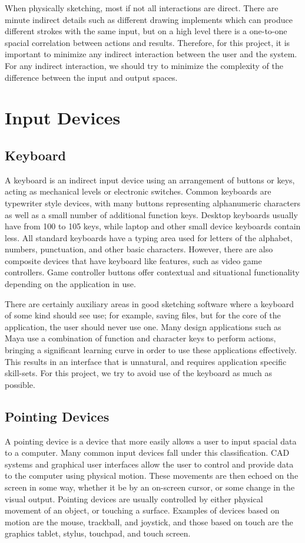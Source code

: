 When physically sketching, most if not all interactions are direct. 
There are minute indirect details such as different drawing implements which can produce different strokes with the same input, but on a high level there is a one-to-one spacial correlation between actions and results.
Therefore, for this project, it is important to minimize any indirect interaction between the user and the system.
For any indirect interaction, we should try to minimize the complexity of the difference between the input and output spaces.

\section{Input Devices}
\subsection{Keyboard}

A keyboard is an indirect input device using an arrangement of buttons or keys, acting as mechanical levels or electronic switches. 
Common keyboards are typewriter style devices, with many buttons representing alphanumeric characters as well as a small number of additional function keys.
Desktop keyboards usually have from 100 to 105 keys, while laptop and other small device keyboards contain less.
All standard keyboards have a typing area used for letters of the alphabet, numbers, punctuation, and other basic characters.
However, there are also composite devices that have keyboard like features, such as video game controllers. 
Game controller buttons offer contextual and situational functionality depending on the application in use.


There are certainly auxiliary areas in good sketching software where a keyboard of some kind should see use; for example, saving files, but for the core of the application, the user should never use one. 
Many design applications such as Maya use a combination of function and character keys to perform actions, bringing a significant learning curve in order to use these applications effectively.
This results in an interface that is unnatural, and requires application specific skill-sets.
For this project, we try to avoid use of the keyboard as much as possible.


\subsection{Pointing Devices}
 A pointing device is a device that more easily allows a user to input spacial data to a computer. 
 Many common input devices fall under this classification. 
 CAD systems and graphical user interfaces allow the user to control and provide data to the computer using physical motion.
 These movements are then echoed on the screen in some way, whether it be by an on-screen cursor, or some change in the visual output.
 Pointing devices are usually controlled by either physical movement of an object, or touching a surface.
 Examples of devices based on motion are the mouse, trackball, and joystick, and those based on touch are the graphics tablet, stylus, touchpad, and touch screen.
 
